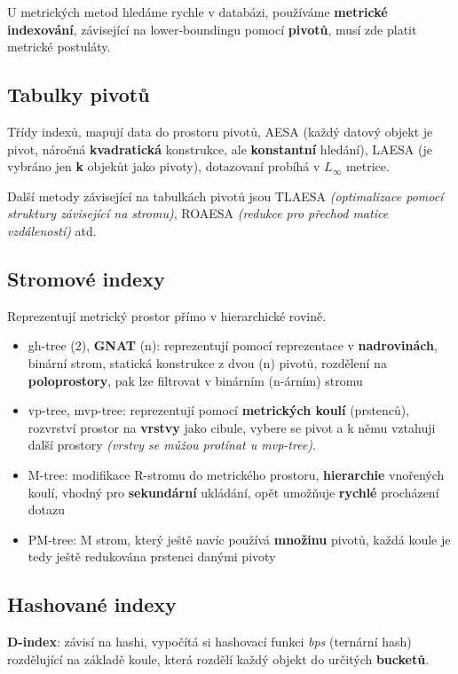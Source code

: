 U metrických metod hledáme rychle v databázi, používáme \textbf{metrické indexování}, závisející na lower-boundingu pomocí \textbf{pivotů}, musí zde platit metrické postuláty.

\subsection{Tabulky pivotů}

Třídy indexů, mapují data do prostoru pivotů, AESA (každý datový objekt je pivot, náročná \textbf{kvadratická} konstrukce, ale \textbf{konstantní} hledání), LAESA (je vybráno jen \textbf{k} objekůt jako pivoty), dotazovaní probíhá v $L_{\infty}$ metrice.

Další metody závisející na tabulkách pivotů jsou TLAESA \textit{(optimalizace pomocí struktury závisející na stromu)}, ROAESA \textit{(redukce pro přechod matice vzdáleností)} atd.

\subsection{Stromové indexy}

Reprezentují metrický prostor přímo v hierarchické rovině.
\begin{itemize}
    \item gh-tree (2), \textbf{GNAT} (n): reprezentují pomocí reprezentace v \textbf{nadrovinách}, binární strom, statická konstrukce z dvou (n) pivotů, rozdělení na \textbf{poloprostory}, pak lze filtrovat v binárním (n-árním) stromu
    \item vp-tree, mvp-tree: reprezentují pomocí \textbf{metrických koulí} (prstenců), rozvrství prostor na \textbf{vrstvy} jako cibule, vybere se pivot a k němu vztahuji další prostory \textit{(vrstvy se můžou protínat u mvp-tree)}.
    \item M-tree: modifikace R-stromu do metrického prostoru, \textbf{hierarchie} vnoře\-ných koulí, vhodný pro \textbf{sekundární} ukládání, opět umožňuje \textbf{rychlé} procházení dotazu
    \item PM-tree: M strom, který ještě navíc používá \textbf{množinu} pivotů, každá koule je tedy ještě redukována prstenci danými pivoty
\end{itemize}

\subsection{Hashované indexy}

\textbf{D-index}: závisí na hashi, vypočítá si hashovací funkci \textit{bps} (ternární hash) rozdělující na základě koule, která rozdělí každý objekt do určitých \textbf{bucketů}.

